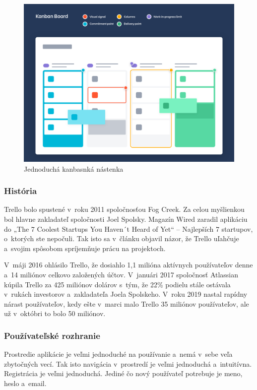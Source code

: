 \begin{figure}[H]
    \centering
    \includegraphics[scale=0.25]{img/obr4.png}
    \caption{Jednoduchá kanbasnká nástenka}
    \label{fig:kab-nas}
\end{figure}

\subsubsection{História}
\indent Trello bolo spustené v roku 2011 spoločnosťou Fog Creek. Za celou myšlienkou bol hlavne zakladateľ spoločnosti Joel Spolsky. Magazín Wired zaradil aplikáciu do „The 7 Coolest Startups You Haven´t Heard of Yet“ – Najlepších 7 startupov, o ktorých ste nepočuli. Tak isto sa v článku objavil názor, že Trello uľahčuje a svojim spôsobom spríjemňuje prácu na projektoch. 

\indent V máji 2016 ohlásilo Trello, že dosiahlo 1,1 milióna aktívnych používateľov denne a 14 miliónov celkovo založených účtov. V januári 2017 spoločnosť Atlassian kúpila Trello za 425 miliónov dolárov s tým, že 22\% podielu stále ostávala v rukách investorov a zakladateľa Joela Spolskeho. V roku 2019 nastal rapídny nárast používateľov, kedy ešte v marci malo Trello 35 miliónov používateľov, ale už v októbri to bolo 50 miliónov.
\subsubsection{Používateľské rozhranie}
\indent Prostredie aplikácie je veľmi jednoduché na používanie a nemá v sebe veľa zbytočných vecí. Tak isto navigácia v prostredí je veľmi jednoduchá a intuitívna. Registrácia je veľmi jednoduchá. Jediné čo nový používateľ potrebuje je meno, heslo a email. 


